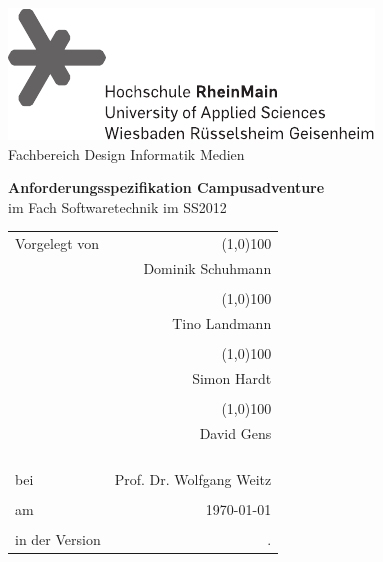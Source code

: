 \begin{titlepage}
	\begin{center}
		\includegraphics{meta/hsrm-logo} \\[0.7cm]
		{Fachbereich Design Informatik Medien}
		
		\vfill

		{\huge \bfseries Anforderungsspezifikation Campusadventure}\\[0.1cm]
                im Fach Softwaretechnik im SS2012
		
		\vfill
		\begin{tabular}{lr}
			Vorgelegt von & \line(1,0){100} \\
						  & Dominik Schuhmann \\ 
						  & \\
						  & \line(1,0){100} \\
                          & Tino Landmann \\ 
						  & \\
						  & \line(1,0){100} \\
                          & Simon Hardt \\
						  & \\
						  & \line(1,0){100} \\
                          & David Gens \\
                        \\
						\\
                        \\
						\\
			bei           & Prof. Dr. Wolfgang Weitz \\
                        \\
						am			  & \today \\
						\\
                        in der Version       &	\svnrev. \\
		\end{tabular}
		\vfill
		
		
	\end{center}
\end{titlepage}
